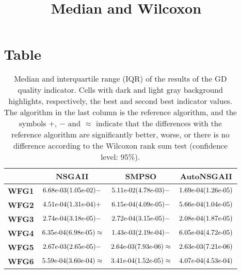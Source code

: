 \documentclass{article}
\title{Median and Wilcoxon}
\author{}
\begin{document}
\maketitle
\section{Table}
\begin{table}[!htp]
  \caption{Median and interquartile range (IQR) of the results of the GD quality indicator. Cells with dark and light gray background highlights, respectively, the best and second best indicator values. The algorithm in the last column is the reference algorithm, and the symbols $+$, $-$ and $\approx$ indicate that the differences with the reference algorithm are significantly better, worse, or there is no difference according to the Wilcoxon rank sum test (confidence level: 95\%).}
  \label{table:GD}
  \centering
  \begin{tiny}
  \begin{tabular}{c|ccc}
      & \textbf{NSGAII} & \textbf{SMPSO} & \textbf{AutoNSGAII} \\\hline
\textbf{WFG1} & $\cellcolor{gray25} {6.68e\makebox[0.1cm]{-}03(1.05e\makebox[0.1cm]{-}02)-} $ & $ {5.11e\makebox[0.1cm]{-}02(4.78e\makebox[0.1cm]{-}03)-} $ & $ \cellcolor{gray95} 1.69e\makebox[0.1cm]{-}04(1.26e\makebox[0.1cm]{-}05)$ \\
\textbf{WFG2} & $\cellcolor{gray95} {4.51e\makebox[0.1cm]{-}04(1.31e\makebox[0.1cm]{-}04)+} $ & $ {6.15e\makebox[0.1cm]{-}04(4.09e\makebox[0.1cm]{-}05)-} $ & $ \cellcolor{gray25} 5.66e\makebox[0.1cm]{-}04(1.04e\makebox[0.1cm]{-}05)$ \\
\textbf{WFG3} & ${2.74e\makebox[0.1cm]{-}04(3.18e\makebox[0.1cm]{-}05)-} $ & $ \cellcolor{gray25} {2.72e\makebox[0.1cm]{-}04(3.15e\makebox[0.1cm]{-}05)-} $ & $ \cellcolor{gray95} 2.08e\makebox[0.1cm]{-}04(1.87e\makebox[0.1cm]{-}05)$ \\
\textbf{WFG4} & $\cellcolor{gray25} {6.35e\makebox[0.1cm]{-}04(6.98e\makebox[0.1cm]{-}05)\approx} $ & $ {1.43e\makebox[0.1cm]{-}03(2.19e\makebox[0.1cm]{-}04)-} $ & $ \cellcolor{gray95} 6.05e\makebox[0.1cm]{-}04(4.72e\makebox[0.1cm]{-}05)$ \\
\textbf{WFG5} & ${2.67e\makebox[0.1cm]{-}03(2.65e\makebox[0.1cm]{-}05)-} $ & $ \cellcolor{gray25} {2.64e\makebox[0.1cm]{-}03(7.93e\makebox[0.1cm]{-}06)\approx} $ & $ \cellcolor{gray95} 2.63e\makebox[0.1cm]{-}03(7.21e\makebox[0.1cm]{-}06)$ \\
\textbf{WFG6} & ${5.59e\makebox[0.1cm]{-}04(3.60e\makebox[0.1cm]{-}04)\approx} $ & $ \cellcolor{gray95} {3.41e\makebox[0.1cm]{-}04(1.52e\makebox[0.1cm]{-}05)\approx} $ & $ \cellcolor{gray25} 4.07e\makebox[0.1cm]{-}04(4.53e\makebox[0.1cm]{-}04)$ \\

\end{tabular}
\end{tiny}
\end{table}
\end{document}
